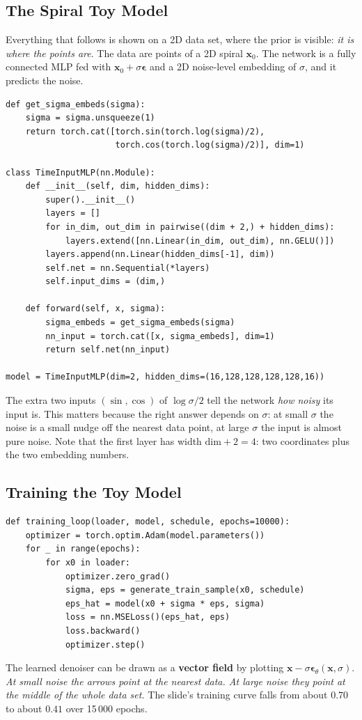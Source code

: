 \documentclass[11pt,a4paper]{article}
\newcommand{\bx}{\bm{x}}
\newcommand{\beps}{\bm{\epsilon}}
\theoremstyle{definition}
\theoremstyle{plain}
\theoremstyle{remark}
\begin{document}
\subsection{The Spiral Toy Model }
Everything that follows is shown on a 2D data set, where the prior is visible: \emph{it is where the points are}. The data are points of a 2D spiral $\bx_0$. The network is a fully connected MLP fed with $\bx_0+\sigma\beps$ and a 2D noise-level embedding of $\sigma$, and it predicts the noise.

\begin{lstlisting}
def get_sigma_embeds(sigma):
    sigma = sigma.unsqueeze(1)
    return torch.cat([torch.sin(torch.log(sigma)/2),
                      torch.cos(torch.log(sigma)/2)], dim=1)

class TimeInputMLP(nn.Module):
    def __init__(self, dim, hidden_dims):
        super().__init__()
        layers = []
        for in_dim, out_dim in pairwise((dim + 2,) + hidden_dims):
            layers.extend([nn.Linear(in_dim, out_dim), nn.GELU()])
        layers.append(nn.Linear(hidden_dims[-1], dim))
        self.net = nn.Sequential(*layers)
        self.input_dims = (dim,)

    def forward(self, x, sigma):
        sigma_embeds = get_sigma_embeds(sigma)
        nn_input = torch.cat([x, sigma_embeds], dim=1)
        return self.net(nn_input)

model = TimeInputMLP(dim=2, hidden_dims=(16,128,128,128,128,16))
\end{lstlisting}

\begin{intuition}
The extra two inputs $(\sin,\cos)$ of $\log\sigma/2$ tell the network \emph{how noisy} its input is. This matters because the right answer depends on $\sigma$: at small $\sigma$ the noise is a small nudge off the nearest data point, at large $\sigma$ the input is almost pure noise. Note that the first layer has width $\text{dim}+2=4$: two coordinates plus the two embedding numbers.
\end{intuition}

\subsection{Training the Toy Model }
\begin{lstlisting}
def training_loop(loader, model, schedule, epochs=10000):
    optimizer = torch.optim.Adam(model.parameters())
    for _ in range(epochs):
        for x0 in loader:
            optimizer.zero_grad()
            sigma, eps = generate_train_sample(x0, schedule)
            eps_hat = model(x0 + sigma * eps, sigma)
            loss = nn.MSELoss()(eps_hat, eps)
            loss.backward()
            optimizer.step()
\end{lstlisting}
The learned denoiser can be drawn as a \textbf{vector field} by plotting $\bx-\sigma\beps_\theta(\bx,\sigma)$. \emph{At small noise the arrows point at the nearest data. At large noise they point at the middle of the whole data set.} The slide's training curve falls from about $0.70$ to about $0.41$ over 15\,000 epochs.
\end{document}
